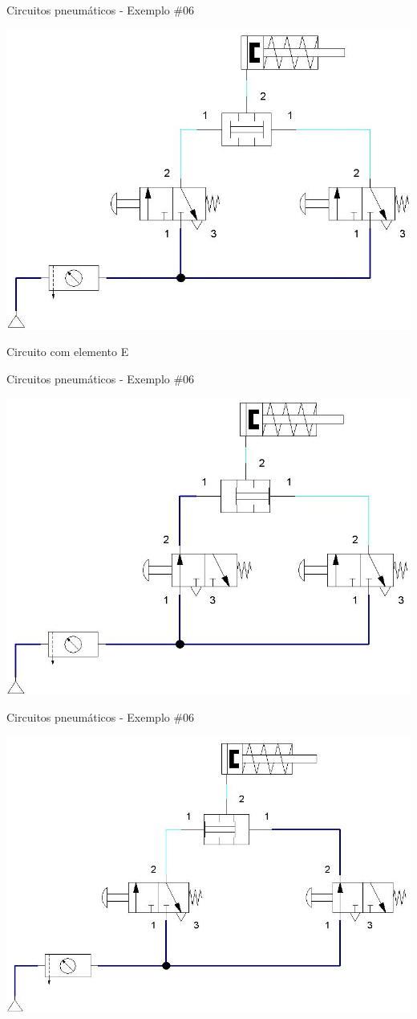 \begin{frame}{Circuitos pneumáticos - Exemplo \#06}
	
	\centering
	\includegraphics[width=0.8\linewidth]{Figuras/Ch14/fig48n3}
	
	\medskip
	
	Circuito com elemento E
	
\end{frame}


\begin{frame}{Circuitos pneumáticos - Exemplo \#06}
	
	\centering
	\includegraphics[width=0.8\linewidth]{Figuras/Ch14/fig48n32}
	
\end{frame}


\begin{frame}{Circuitos pneumáticos - Exemplo \#06}
	
	\centering
	\includegraphics[width=0.8\linewidth]{Figuras/Ch14/fig48n33}
	
\end{frame}


